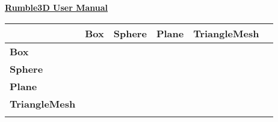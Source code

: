 \documentclass[10pt,a4paper]{article}
\begin{document}
	\begin{titlepage}
		\centering
		\LARGE\underline{\textbf{Rumble3D User Manual}}
	\end{titlepage}
	
	\tableofcontents
	\newpage
	
		
	
	\begin{table}[ht]
		\begin{tabular}{l || l | l | l | l | l |}
			\hline
			 & \textbf{Box} & \textbf{Sphere} & \textbf{Plane} & \textbf{TriangleMesh} &\\
			\hline
			\hline
			\textbf{Box} & & & & &\\
			\hline
			\textbf{Sphere} & & & & &\\
			\hline
			\textbf{Plane}& & & & &\\
			\hline
			\textbf{TriangleMesh} & & & & &\\
			\hline
			\textbf{} & & & & &\\
			\hline
		\end{tabular}
	\end{table}
	
	
	\newpage
	\appendix
	\listoffigures
	\listoftables
\end{document}
